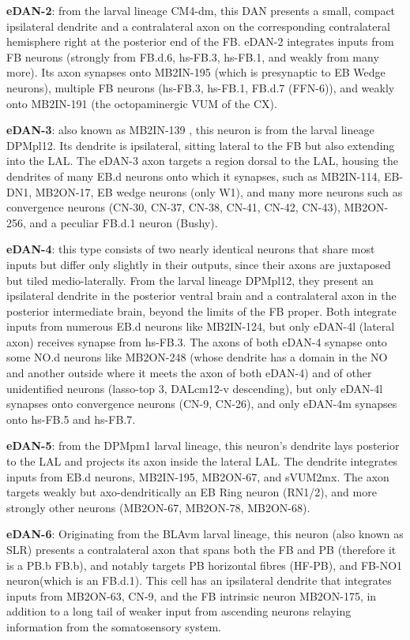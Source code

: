     \textbf{eDAN-2}: from the larval lineage CM4-dm, this DAN presents a small, compact ipsilateral dendrite and a contralateral axon on the corresponding contralateral hemisphere right at the posterior end of the FB. eDAN-2 integrates inputs from FB neurons (strongly from FB.d.6, hs-FB.3, hs-FB.1, and weakly from many more). Its axon synapses onto MB2IN-195 (which is presynaptic to EB Wedge neurons), multiple FB neurons (hs-FB.3, hs-FB.1, FB.d.7 (FFN-6)), and weakly onto MB2IN-191 (the octopaminergic VUM of the CX).

    \textbf{eDAN-3}: also known as MB2IN-139 \citep{eschbach2021circuits}, this neuron is from the larval lineage DPMpl12. Its dendrite is ipsilateral, sitting lateral to the FB but also extending into the LAL. The eDAN-3 axon targets a region dorsal to the LAL, housing the dendrites of  many EB.d neurons onto which it synapses, such as MB2IN-114, EB-DN1, MB2ON-17, EB wedge neurons (only W1), and many more neurons such as convergence neurons (CN-30, CN-37, CN-38, CN-41, CN-42, CN-43), MB2ON-256, and a peculiar FB.d.1 neuron (Bushy).

    \textbf{eDAN-4}: this type consists of two nearly identical neurons that share most inputs but differ only slightly in their outputs, since their axons are juxtaposed but tiled medio-laterally. From the larval lineage DPMpl12, they present an ipsilateral dendrite in the posterior ventral brain and a contralateral axon in the posterior intermediate brain, beyond the limits of the FB proper. Both integrate inputs from numerous EB.d neurons like MB2IN-124, but only eDAN-4l (lateral axon) receives synapse from hs-FB.3. The axons of both eDAN-4 synapse onto some NO.d neurons like MB2ON-248 (whose dendrite has a domain in the NO and another outside where it meets the axon of both eDAN-4) and of other unidentified neurons (lasso-top 3, DALcm12-v descending), but only eDAN-4l synapses onto convergence neurons (CN-9, CN-26), and only eDAN-4m synapses onto hs-FB.5 and hs-FB.7.

    \textbf{eDAN-5}: from the DPMpm1 larval lineage, this neuron's dendrite lays posterior to the LAL and projects its axon inside the lateral LAL. The dendrite integrates inputs from EB.d neurons, MB2IN-195, MB2ON-67, and sVUM2mx. The axon targets weakly but axo-dendritically an EB Ring neuron (RN1/2), and more strongly other neurons (MB2ON-67, MB2ON-78, MB2ON-68).


    \textbf{eDAN-6}: Originating from the BLAvm larval lineage, this neuron (also known as SLR) presents a contralateral axon that spans both the FB and PB (therefore it is a PB.b FB.b), and notably targets PB horizontal fibres (HF-PB), and FB-NO1 neuron(which is an FB.d.1). This cell has an ipsilateral dendrite that integrates inputs from MB2ON-63, CN-9, and the FB intrinsic neuron MB2ON-175, in addition to a long tail of weaker input from ascending neurons relaying information from the somatosensory system. 


